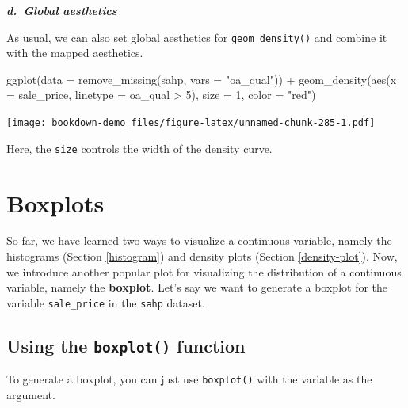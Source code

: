 \documentclass[
]{book}
\newenvironment{Shaded}{\begin{snugshade}}{\end{snugshade}}
\newcommand{\AttributeTok}[1]{\textcolor[rgb]{0.77,0.63,0.00}{#1}}
\newcommand{\DecValTok}[1]{\textcolor[rgb]{0.00,0.00,0.81}{#1}}
\newcommand{\FunctionTok}[1]{\textcolor[rgb]{0.00,0.00,0.00}{#1}}
\newcommand{\NormalTok}[1]{#1}
\newcommand{\OtherTok}[1]{\textcolor[rgb]{0.56,0.35,0.01}{#1}}
\newcommand{\SpecialCharTok}[1]{\textcolor[rgb]{0.00,0.00,0.00}{#1}}
\newcommand{\StringTok}[1]{\textcolor[rgb]{0.31,0.60,0.02}{#1}}
\begin{document}
\textbf{\emph{d.~Global aesthetics}}

As usual, we can also set global aesthetics for \texttt{geom\_density()} and combine it with the mapped aesthetics.

\begin{Shaded}
\begin{Highlighting}[]
\FunctionTok{ggplot}\NormalTok{(}\AttributeTok{data =} \FunctionTok{remove\_missing}\NormalTok{(sahp, }\AttributeTok{vars =} \StringTok{"oa\_qual"}\NormalTok{)) }\SpecialCharTok{+}  \FunctionTok{geom\_density}\NormalTok{(}\FunctionTok{aes}\NormalTok{(}\AttributeTok{x =}\NormalTok{ sale\_price, }\AttributeTok{linetype =}\NormalTok{ oa\_qual }\SpecialCharTok{\textgreater{}} \DecValTok{5}\NormalTok{), }\AttributeTok{size =} \DecValTok{1}\NormalTok{, }\AttributeTok{color =} \StringTok{"red"}\NormalTok{)}
\end{Highlighting}
\end{Shaded}

\texttt{[image: bookdown-demo\_files/figure-latex/unnamed-chunk-285-1.pdf]}

Here, the \texttt{size} controls the width of the density curve.

\hypertarget{boxplots}{%
\section{Boxplots}\label{boxplots}}

So far, we have learned two ways to visualize a continuous variable, namely the histograms (Section \ref{histogram}) and density plots (Section \ref{density-plot}). Now, we introduce another popular plot for visualizing the distribution of a continuous variable, namely the \textbf{boxplot}. Let's say we want to generate a boxplot for the variable \texttt{sale\_price} in the \texttt{sahp} dataset.

\hypertarget{using-the-boxplot-function}{%
\subsection{\texorpdfstring{Using the \texttt{boxplot()} function}{Using the boxplot() function}}\label{using-the-boxplot-function}}

To generate a boxplot, you can just use \texttt{boxplot()} with the variable as the argument.

\begin{Shaded}
\end{Shaded}
\end{document}
